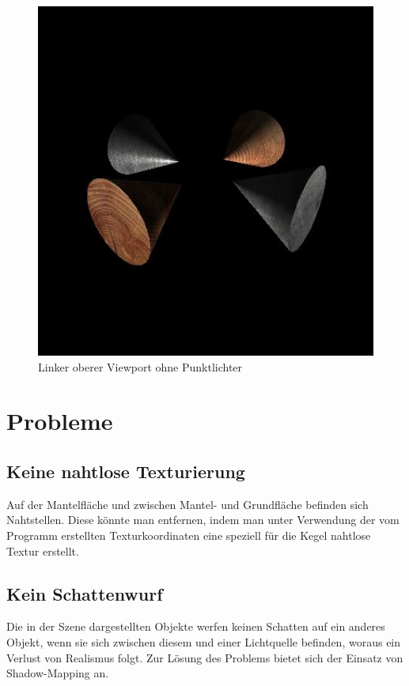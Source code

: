 \documentclass{scrartcl}
\begin{document}
        \begin{figure}[!htpb]
            \centering
            \includegraphics[scale=0.5]{scrshot1.jpg}
            \caption*{Linker oberer Viewport ohne Punktlichter}
        \end{figure}
    \newpage

    \section{Probleme}
        \subsection{Keine nahtlose Texturierung}
            Auf der Mantelfläche und zwischen Mantel- und Grundfläche befinden sich 
            Nahtstellen. Diese könnte man entfernen, indem man unter Verwendung der 
            vom Programm erstellten Texturkoordinaten eine speziell für die Kegel nahtlose 
            Textur erstellt.

        \subsection{Kein Schattenwurf}
            Die in der Szene dargestellten Objekte werfen keinen Schatten auf ein anderes 
            Objekt, wenn sie sich zwischen diesem und einer Lichtquelle befinden, woraus 
            ein Verlust von Realismus folgt. Zur Lösung des Problems bietet sich der 
            Einsatz von Shadow-Mapping an.
\end{document}
